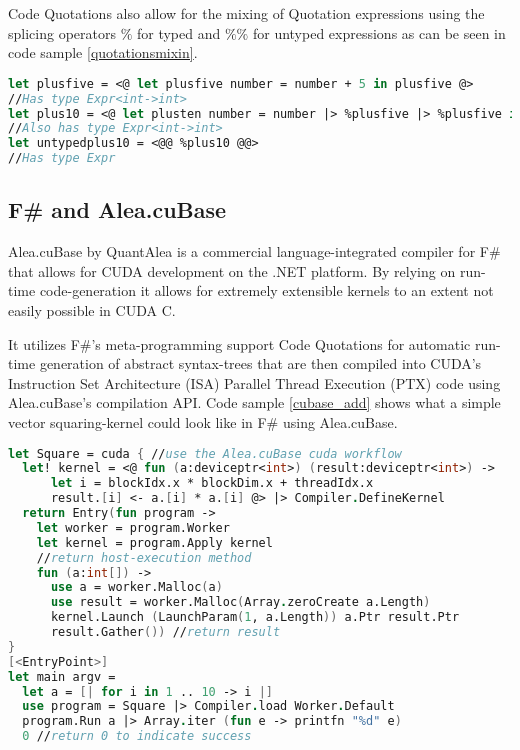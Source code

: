 Code Quotations also allow for the mixing of Quotation expressions using the splicing operators $\%$ for typed and $\%\%$ for untyped expressions as can be seen in code sample \ref{quotationsmixin}.

\begin{lstlisting}[caption=Quotation mixing, label=quotationsmixin, language=FSharp]
let plusfive = <@ let plusfive number = number + 5 in plusfive @>
//Has type Expr<int->int>
let plus10 = <@ let plusten number = number |> %plusfive |> %plusfive in plusten @>
//Also has type Expr<int->int>
let untypedplus10 = <@@ %plus10 @@>
//Has type Expr
\end{lstlisting}


\subsection{F\# and Alea.cuBase}\label{subsec:background:fsharpcubase}
Alea.cuBase by QuantAlea\cite{quantalea} is a commercial language-integrated compiler for F\# that allows for CUDA development on the .NET platform.
By relying on run-time code-generation it allows for extremely extensible kernels to an extent not easily possible in CUDA C.

It utilizes F\#'s meta-programming support Code Quotations for automatic run-time generation of abstract syntax-trees that are then compiled into CUDA's Instruction Set Architecture (ISA) Parallel Thread Execution (PTX) code using Alea.cuBase's compilation API.
Code sample \ref{cubase_add} shows what a simple vector squaring-kernel could look like in F\# using Alea.cuBase.

\begin{lstlisting}[caption=Alea.cuBase square kernel, label=cubase_add, language=FSharp]
let Square = cuda { //use the Alea.cuBase cuda workflow
  let! kernel = <@ fun (a:deviceptr<int>) (result:deviceptr<int>) ->
      let i = blockIdx.x * blockDim.x + threadIdx.x
      result.[i] <- a.[i] * a.[i] @> |> Compiler.DefineKernel
  return Entry(fun program ->
    let worker = program.Worker
    let kernel = program.Apply kernel
    //return host-execution method
    fun (a:int[]) ->
      use a = worker.Malloc(a)
      use result = worker.Malloc(Array.zeroCreate a.Length)
      kernel.Launch (LaunchParam(1, a.Length)) a.Ptr result.Ptr
      result.Gather()) //return result
}
[<EntryPoint>]
let main argv = 
  let a = [| for i in 1 .. 10 -> i |]
  use program = Square |> Compiler.load Worker.Default
  program.Run a |> Array.iter (fun e -> printfn "%d" e)
  0 //return 0 to indicate success
\end{lstlisting}

